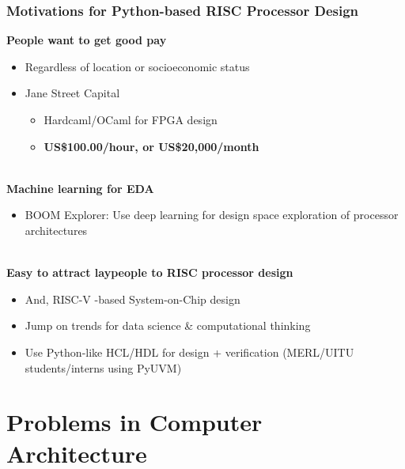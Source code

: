 \documentclass[xcolor={usenames,dvipsnames},hyperref={hyperindex,bookmarks}]{beamer}
\begin{document}
\begin{frame}
	\frametitle{Motivations for Python-based RISC Processor Design}
	
	{\bf People want to get good pay}
		\begin{itemize}
		\item Regardless of location or socioeconomic status
		\item Jane Street Capital
			\begin{itemize}
			\item Hardcaml/OCaml for FPGA design
			\item {\bf US\$100.00/hour, or US\$20,000/month}
			\end{itemize}
		\end{itemize}
	\ \\
	{\bf Machine learning for EDA}
		\begin{itemize}
		\item BOOM Explorer: Use deep learning for design space exploration of processor architectures
		\end{itemize}
	\ \\
	{\bf Easy to attract laypeople to RISC processor design}
		\begin{itemize}
		\item And, RISC-V -based System-on-Chip design
		\item Jump on trends for data science {\rm \&} computational thinking
		\item Use Python-like HCL/HDL for design + verification (MERL/UITU students/interns using PyUVM)
		\end{itemize}

\end{frame}










\section{Problems in Computer Architecture}

\end{document}
